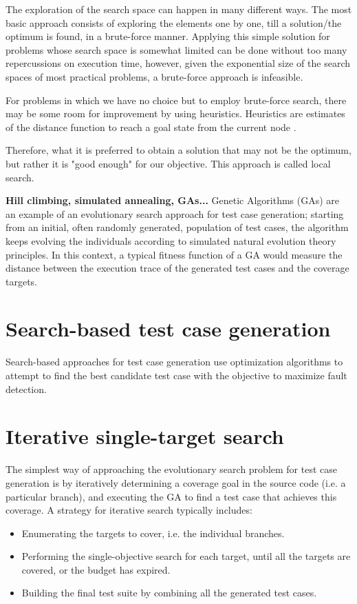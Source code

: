 The exploration of the search space can happen in many different ways. The most basic approach consists of exploring the elements one by one, till a solution/the optimum is found, in a brute-force manner. Applying this simple solution for problems whose search space is somewhat limited can be done without too many repercussions on execution time, however, given the exponential size of the search spaces of most practical problems, a brute-force approach is infeasible. 

For problems in which we have no choice but to employ brute-force search, there may be some room for improvement by using heuristics. Heuristics are estimates of the distance function to reach a goal state from the current node \cite{HeuristicSearch}.


Therefore, what it is preferred to obtain a solution that may not be the optimum, but rather it is "good enough" for our objective. This approach is called local search.

 
\textbf{Hill climbing, simulated annealing, GAs...}
Genetic Algorithms (GAs) are an example of an
evolutionary search approach for test case generation; starting from an initial, often randomly generated, population of 
test cases, the algorithm keeps evolving the individuals according to simulated natural evolution theory principles.
In this context, a typical fitness function of a GA would measure the distance between the execution trace of the generated test cases
and the coverage targets.


\section{Search-based test case generation}
Search-based approaches for test case generation use optimization algorithms to attempt to find 
the best candidate test case with the objective to maximize fault detection. 


\section{Iterative single-target search}
The simplest way of approaching the evolutionary search problem for test case generation is by iteratively determining a coverage goal in the source code (i.e. a particular branch), and executing the GA to find a test case that achieves this coverage. 
A strategy for iterative search typically includes:
\begin{itemize}
    \item Enumerating the targets to cover, i.e. the individual branches.
    \item Performing the single-objective search for each target, until all the targets are covered, or the budget has expired.
    \item Building the final test suite by combining all the generated test cases.
\end{itemize}


